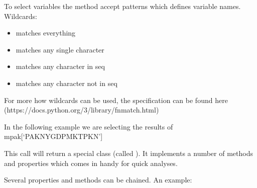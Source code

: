 \documentclass[letterpaper,10pt,english]{jupyterBook}
\begin{document}
\sphinxAtStartPar
To select variables the method accept patterns which defines variable names. Wildcards:
\begin{itemize}
\item {} 
\sphinxAtStartPar
\sphinxcode{\sphinxupquote{\textbackslash{}*}} matches everything

\item {} 
\sphinxAtStartPar
{} matches any single character

\item {} 
\sphinxAtStartPar
\sphinxcode{\sphinxupquote{\textbackslash{}{[}seq{]}}} matches any character in seq

\item {} 
\sphinxAtStartPar
\sphinxcode{\sphinxupquote{\textbackslash{}{[}!seq{]}}} matches any character not in seq

\end{itemize}

\sphinxAtStartPar
For more how wildcards can be used, the specification can be found here (https://docs.python.org/3/library/fnmatch.html)

\sphinxAtStartPar
In the following example we are selecting the results of mpak{[}‘PAKNYGDPMKTPKN’{]}

\sphinxAtStartPar
This call will return a special class (called ). It implements a number
of methods and properties which comes in handy for quick analyses.

\sphinxAtStartPar
Several properties and methods can be chained. An example:
\end{document}

